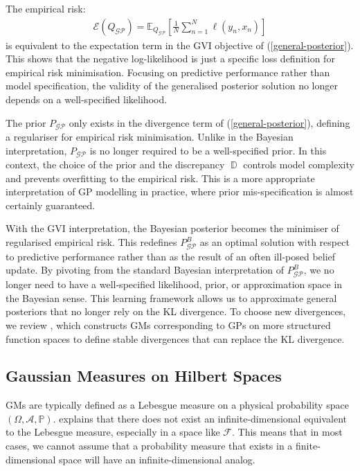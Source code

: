 \documentclass{article}
\newcommand{\D}{\operatorname{\mathbb{D}}}
\newcommand{\GP}{\operatorname{\mathcal{GP}}}
\numberwithin{equation}{section}
\begin{document}
The empirical risk: 
\begin{align}
\mathcal{E}(Q_{\GP}) = \mathbb{E}_{Q_{\GP}}\left[\frac{1}{N}\sum_{n=1}^N \ell\left(y_n, x_n\right)\right]
\label{empirical-risk}
\end{align}
is equivalent to the expectation term in the GVI objective of (\ref{general-posterior}). This shows that the negative log-likelihood is just a specific loss definition for empirical risk minimisation. Focusing on predictive performance rather than model specification, the validity of the generalised posterior solution no longer depends on a well-specified likelihood.

The prior $P_{\GP}$ only exists in the divergence term of (\ref{general-posterior}), defining a regulariser for empirical risk minimisation. Unlike in the Bayesian interpretation, $P_{\GP}$ is no longer required to be a well-specified prior. In this context, the choice of the prior and the discrepancy $\D$ controls model complexity and prevents overfitting to the empirical risk. This is a more appropriate interpretation of GP modelling in practice, where prior mis-specification is almost certainly guaranteed.

With the GVI interpretation, the Bayesian posterior becomes the minimiser of regularised empirical risk. This redefines $P_{\GP}^B$ as an optimal solution with respect to predictive performance rather than as the result of an often ill-posed belief update. By pivoting from the standard Bayesian interpretation of $P_{\GP}^B$, we no longer need to have a well-specified likelihood, prior, or approximation space in the Bayesian sense. This learning framework allows us to approximate general posteriors that no longer rely on the KL divergence. To choose new divergences, we review \cite{wild2022generalized}, which constructs GMs corresponding to GPs on more structured function spaces to define stable divergences that can replace the KL divergence.

\subsection{Gaussian Measures on Hilbert Spaces}
GMs are typically defined as a Lebesgue measure on a physical probability space $(\Omega, \mathcal{A}, \mathbb{P})$. \cite{matthews2017scalable} explains that there does not exist an infinite-dimensional equivalent to the Lebesgue measure, especially in a space like $\mathcal{F}$. This means that in most cases, we cannot assume that a  probability measure that exists in a finite-dimensional space will have an infinite-dimensional analog.
\end{document}

